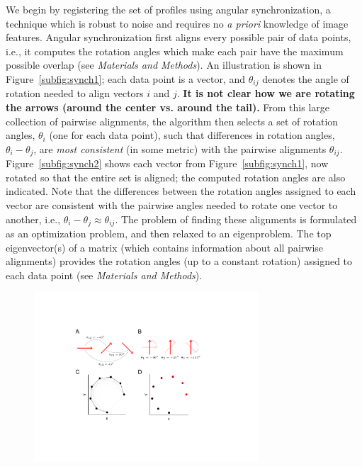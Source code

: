\documentclass{pnastwo}
\begin{document}
\begin{article}
We begin by registering the set of profiles using angular synchronization\cite{singer2011angular}, a technique which is robust to noise and requires no {\it a priori} knowledge of image features.
%
Angular synchronization first aligns every possible pair of data points, i.e., it computes the rotation angles
which make each pair have the maximum possible overlap (see {\it Materials and Methods}).
%
An illustration is shown in Figure~\ref{subfig:synch1};
each data point is a vector, and $\theta_{ij}$ denotes the angle of rotation needed to align vectors $i$ and $j$.
%
{\bf It is not clear how we are rotating the arrows (around the center vs. around the tail).}
%
From this large collection of pairwise alignments, the algorithm then selects a set of rotation angles, $\theta_i$ (one for each data point), such that differences in rotation angles, $\theta_i-\theta_j$, are {\it most consistent} (in some metric) with the pairwise alignments $\theta_{ij}$.
%
Figure~\ref{subfig:synch2} shows each vector from Figure~\ref{subfig:synch1}, now rotated so that the entire set is aligned; the computed rotation angles are also indicated.
%
Note that the differences between the rotation angles assigned to each vector are consistent with the pairwise angles needed to rotate one vector to another, i.e., $\theta_i - \theta_j \approx \theta_{ij}$.
%
The problem of finding these alignments is formulated as an optimization problem, and then relaxed to an eigenproblem.
%
The top eigenvector(s) of a matrix (which contains information about all pairwise alignments)
provides the rotation angles (up to a constant rotation) assigned to each data point (see {\it Materials and Methods}).
%
%
\begin{figure}[t]
\includegraphics[width=8.4cm]{fig4}

\end{figure}
\end{article}
\end{document}
